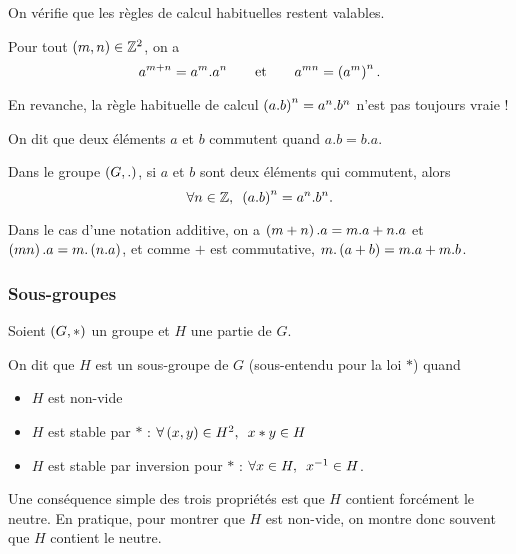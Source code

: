 On vérifie que les règles de calcul habituelles restent valables.

\begin{prop}
Pour tout \(\left(m,n\right)\in\mathbb{Z}^2\), on a \[a^{m+n}=a^m.a^n\qquad\text{et}\qquad a^{mn}=\left(a^m\right)^n.\]
\end{prop}

En revanche, la règle habituelle de calcul \(\left(a.b\right)^n=a^n.b^n\) n'est pas toujours vraie !

\begin{defi}
On dit que deux éléments \(a\) et \(b\) commutent quand \(a.b=b.a\).
\end{defi}

\begin{prop}
Dans le groupe \(\groupe{G}[.]\), si \(a\) et \(b\) sont deux éléments qui commutent, alors \[\quantifs{\forall n\in\Z}\paren{a.b}^n=a^n.b^n.\]
\end{prop}

\begin{rem}
Dans le cas d'une notation additive, on a \(\left(m+n\right).a=m.a+n.a\) et \(\left(mn\right).a=m.\left(n.a\right)\), et comme \(+\) est commutative, \(m.\left(a+b\right)=m.a+m.b\).
\end{rem}

\subsubsection{Sous-groupes}

\begin{defi}
Soient \(\groupe{G}[*]\) un groupe et \(H\) une partie de \(G\).

On dit que \(H\) est un sous-groupe de \(G\) (sous-entendu pour la loi \(*\)) quand

\begin{itemize}
    \item \(H\) est non-vide \\
    \item \(H\) est stable par \(*\) : \(\quantifs{\forall\paren{x,y}\in H^2}x*y\in H\) \\
    \item \(H\) est stable par inversion pour \(*\) : \(\quantifs{\forall x\in H}x\inv\in H\).
\end{itemize}
\end{defi}

Une conséquence simple des trois propriétés est que \(H\) contient forcément le neutre. En pratique, pour montrer que \(H\) est non-vide, on montre donc souvent que \(H\) contient le neutre.

